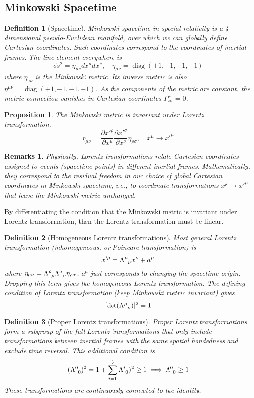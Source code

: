 \documentclass[a4paper]{article}
\DeclareMathOperator{\diag}{diag}
\newtheorem{remarks}{Remarks}[section]
\theoremstyle{new}
\newtheorem{defi}{Definition}[section]
\newtheorem{prop}{Proposition}[section]
\begin{document}
\subsection{Minkowski Spacetime}
\begin{defi}[Spacetime]
Minkowski spacetime in special relativity is a 4-dimensional pseudo-Euclidean manifold, over which we can globally define Cartesian coordinates. Such coordinates correspond to the coordinates of inertial frames. The line element everywhere is
$$ds^2=\eta_{\mu\nu}dx^\mu dx^\nu,\quad\eta_{\mu\nu}=\diag(+1,-1,-1,-1)$$
where $\eta_{\mu\nu}$ is the Minkowski metric. Its inverse metric is also $\eta^{\mu\nu}=\diag(+1,-1,-1,-1)$. As the components of the metric are constant, the metric connection vanishes in Cartesian coordinates $\Gamma^\mu_{\nu\sigma}=0$.
\end{defi}
\begin{prop}
The Minkowski metric is invariant under Lorentz transformation.
$$\eta_{\mu\nu}=\frac{\partial x'^\rho}{\partial x^\mu}\frac{\partial x'^\sigma}{\partial x^\nu}\eta_{\rho\sigma},\quad x^\mu\rightarrow x'^\mu$$
\end{prop}
\begin{remarks}
Physically, Lorentz transformations relate Cartesian coordinates assigned to events (spacetime points) in different inertial frames. Mathematically, they correspond to the residual freedom in our choice of global Cartesian coordinates in Minkowski spacetime, i.e., to coordinate transformations $x^\mu\rightarrow x'^\mu$ that leave the Minkowski metric unchanged.
\end{remarks}
By differentiating the condition that the Minkowski metric is invariant under Lorentz transformation, then the Lorentz transformation must be linear.
\begin{defi}[Homogeneous Lorentz transformations]
Most general Lorentz transformation (inhomogeneous, or Poincare transformation) is
$$x'^\mu=\tensor*{\Lambda}{*_{}^{\mu}_{\nu}}x^\nu+a^\mu$$
where $\eta_{\mu\nu}=\tensor*{\Lambda}{*_{}^{\rho}_{\mu}}\tensor*{\Lambda}{*_{}^{\sigma}_{\nu}}\eta_{\rho\sigma}$. $a^\mu$ just corresponds to changing the spacetime origin. Dropping this term gives the homogeneous Lorentz transformation. The defining condition of Lorentz transformation (keep Minkowski metric invariant) gives
$$[\det(\tensor*{\Lambda}{*_{}^{\mu}_{\nu}})]^2=1$$
\end{defi}
\begin{defi}[Proper Lorentz transformations]
Proper Lorentz transformations form a subgroup of the full Lorentz transformations that only include transformations between inertial frames with the same spatial handedness and exclude time reversal. This additional condition is
$$(\tensor*{\Lambda}{*_{}^{0}_{0}})^2=1+\sum_{i=1}^3\tensor*{\Lambda}{*_{}^{i}_{0}})^2\geq1\implies\tensor*{\Lambda}{*_{}^{0}_{0}}\geq1$$
These transformations are continuously connected to the identity.
\end{defi}
\end{document}
